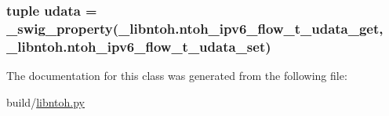 \hypertarget{classlibntoh_1_1ntoh__ipv6__flow__t_a6900744e840ca75a67e020c38d143891}{
\subsubsection[{udata}]{\setlength{\rightskip}{0pt plus 5cm}tuple udata = {\bf \-\_\-swig\-\_\-property}(\-\_\-libntoh.\-ntoh\-\_\-ipv6\-\_\-flow\-\_\-t\-\_\-udata\-\_\-get, \-\_\-libntoh.\-ntoh\-\_\-ipv6\-\_\-flow\-\_\-t\-\_\-udata\-\_\-set)\hspace{0.3cm}{\ttfamily [static]}}}\label{classlibntoh_1_1ntoh__ipv6__flow__t_a6900744e840ca75a67e020c38d143891}


The documentation for this class was generated from the following file\-:\begin{DoxyCompactItemize}
\item 
build/\hyperlink{libntoh_8py}{libntoh.\-py}\end{DoxyCompactItemize}
